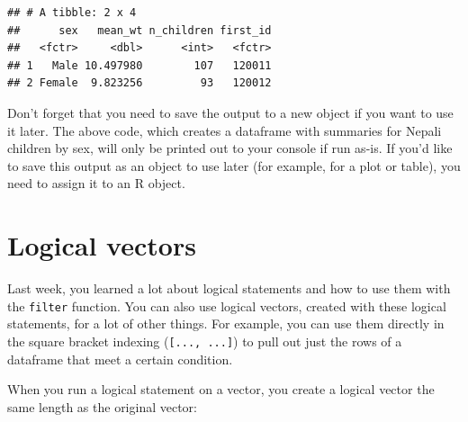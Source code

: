 \documentclass[]{book}
\makeatletter
\newenvironment{Shaded}{\begin{snugshade}}{\end{snugshade}}
\newcommand{\KeywordTok}[1]{\textcolor[rgb]{0.13,0.29,0.53}{\textbf{#1}}}
\newcommand{\DataTypeTok}[1]{\textcolor[rgb]{0.13,0.29,0.53}{#1}}
\newcommand{\StringTok}[1]{\textcolor[rgb]{0.31,0.60,0.02}{#1}}
\newcommand{\OtherTok}[1]{\textcolor[rgb]{0.56,0.35,0.01}{#1}}
\newcommand{\OperatorTok}[1]{\textcolor[rgb]{0.81,0.36,0.00}{\textbf{#1}}}
\newcommand{\NormalTok}[1]{#1}
\newenvironment{kframe}{%
\medskip{}
\setlength{\fboxsep}{.8em}
 \def\at@end@of@kframe{}%
 \ifinner\ifhmode%
  \def\at@end@of@kframe{\end{minipage}}%
  \begin{minipage}{\columnwidth}%
 \fi\fi%
 \def\FrameCommand##1{\hskip\@totalleftmargin \hskip-\fboxsep
 \colorbox{shadecolor}{##1}\hskip-\fboxsep
     \hskip-\linewidth \hskip-\@totalleftmargin \hskip\columnwidth}%
 \MakeFramed {\advance\hsize-\width
   \@totalleftmargin\z@ \linewidth\hsize
   \@setminipage}}%
 {\par\unskip\endMakeFramed%
 \at@end@of@kframe}
\renewenvironment{Shaded}{\begin{kframe}}{\end{kframe}}
\newenvironment{rmdblock}[1]
  {
  \begin{itemize}
  \renewcommand{\labelitemi}{
    \raisebox{-.7\height}[0pt][0pt]{
      {\setkeys{Gin}{width=3em,keepaspectratio}\texttt{[image: images/\#1]}}
    }
  }
  \setlength{\fboxsep}{1em}
  \begin{kframe}
  \item
  }
  {
  \end{kframe}
  \end{itemize}
  }
\newenvironment{rmdnote}
  {\begin{rmdblock}{note}}
  {\end{rmdblock}}
\theoremstyle{definition}
\theoremstyle{definition}
\theoremstyle{definition}
\theoremstyle{remark}
\makeatother
\begin{document}
\begin{Shaded}
\end{Shaded}

\begin{verbatim}
## # A tibble: 2 x 4
##      sex   mean_wt n_children first_id
##   <fctr>     <dbl>      <int>   <fctr>
## 1   Male 10.497980        107   120011
## 2 Female  9.823256         93   120012
\end{verbatim}

\begin{rmdnote}
Don't forget that you need to save the output to a new object if you
want to use it later. The above code, which creates a dataframe with
summaries for Nepali children by sex, will only be printed out to your
console if run as-is. If you'd like to save this output as an object to
use later (for example, for a plot or table), you need to assign it to
an R object.
\end{rmdnote}

\section{Logical vectors}\label{logical-vectors}

Last week, you learned a lot about logical statements and how to use
them with the \texttt{filter} function. You can also use logical
vectors, created with these logical statements, for a lot of other
things. For example, you can use them directly in the square bracket
indexing (\texttt{{[}...,\ ...{]}}) to pull out just the rows of a
dataframe that meet a certain condition.

When you run a logical statement on a vector, you create a logical
vector the same length as the original vector:

\begin{Shaded}
\end{Shaded}
\end{document}
